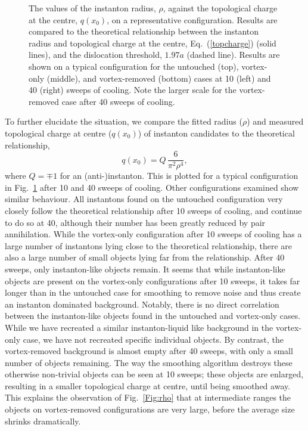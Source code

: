 \documentclass[
 reprint,
 amsmath,amssymb,
 aps,
prd,
]{revtex4-1}
\begin{document}
\begin{figure}[thpb]
\caption{The values of the instanton radius, $\rho$, against the topological charge at the centre, $q(x_{0})$, on a representative configuration. Results are compared to the theoretical relationship between the instanton radius and topological charge at the centre, Eq.~(\ref{topcharge}) (solid lines), and the dislocation threshold, $1.97a$ (dashed line). Results are shown on a typical configuration for the untouched (top), vortex-only (middle), and vortex-removed (bottom) cases at 10 (left) and 40 (right) sweeps of cooling. Note the larger scale for the vortex-removed case after 40 sweeps of cooling.}
\label{Fig:cool10RvQ}
\end{figure}

To further elucidate the situation, we compare the fitted radius ($\rho$) and measured topological charge at centre ($q(x_{0})$) of instanton candidates to the theoretical relationship,
\begin{equation}
\label{topcharge}
q(x_{0})=Q\,\frac{6}{\pi^{2} \rho^{4}},
\end{equation}
where $Q=\mp 1$ for an (anti-)instanton. This is plotted for a typical configuration in Fig.~\ref{Fig:cool10RvQ} after 10 and 40 sweeps of cooling. Other configurations examined show similar behaviour. All instantons found on the untouched configuration very closely follow the theoretical relationship after 10 sweeps of cooling, and continue to do so at 40, although their number has been greatly reduced by pair annihilation. While the vortex-only configuration after 10 sweeps of cooling has a large number of instantons lying close to the theoretical relationship, there are also a large number of small objects lying far from the relationship. After 40 sweeps, only instanton-like objects remain. It seems that while instanton-like objects are present on the vortex-only configurations after 10 sweeps, it takes far longer than in the untouched case for smoothing to remove noise and thus create an instanton dominated background. Notably, there is no direct correlation between the instanton-like objects found in the untouched and vortex-only cases. While we have recreated a similar instanton-liquid like background in the vortex-only case, we have not recreated specific individual objects. By contrast, the vortex-removed background is almost empty after 40 sweeps, with only a small number of objects remaining. The way the smoothing algorithm destroys these otherwise non-trivial objects can be seen at 10 sweeps; these objects are enlarged, resulting in a smaller topological charge at centre, until being smoothed away. This explains the observation of Fig.~\ref{Fig:rho} that at intermediate ranges the objects on vortex-removed configurations are very large, before the average size shrinks dramatically.
\end{document}
